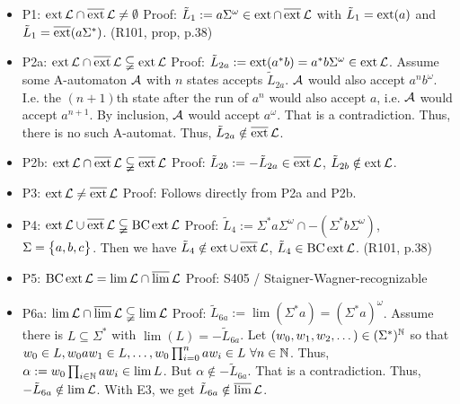 \begin{itemize}
\item P1: $\operatorname{ext} \mathcal{L} \cap \operatorname{\overline{ext}} \mathcal{L} \neq \emptyset$ \newline
Proof: $\tilde{L}_1 := a \Sigma^\omega \in \operatorname{ext} \cap \operatorname{\overline{ext}} \mathcal{L}$ with $\tilde{L}_1 = \operatorname{ext}(a)$ and $\tilde{L}_1 = \operatorname{\overline{ext}} (a \Sigma^*)$. (R101, prop, p.38)
\item P2a: $\operatorname{ext} \mathcal{L} \cap \operatorname{\overline{ext}} \mathcal{L} \subsetneqq \operatorname{ext} \mathcal{L}$ \newline
Proof: $\tilde{L}_{2a} := \operatorname{ext}(a^* b) = a^* b \Sigma^\omega \in \operatorname{ext} \mathcal{L}$. Assume some A-automaton $\mathcal{A}$ with $n$ states accepts $\tilde{L}_{2a}$. $\mathcal{A}$ would also accept $a^n b^\omega$. I.e. the $(n+1)$th state after the run of $a^n$ would also accept $a$, i.e. $\mathcal{A}$ would accept $a^{n+1}$. By inclusion, $\mathcal{A}$ would accept $a^\omega$. That is a contradiction. Thus, there is no such A-automat. Thus, $\tilde{L}_{2a} \notin \operatorname{\overline{ext}} \mathcal{L}$.
\item P2b: $\operatorname{ext} \mathcal{L} \cap \operatorname{\overline{ext}} \mathcal{L} \subsetneqq \operatorname{\overline{ext}} \mathcal{L}$ \newline
Proof: $\tilde{L}_{2b} := - \tilde{L}_{2a} \in \operatorname{\overline{ext}} \mathcal{L}$, $\tilde{L}_{2b} \notin \operatorname{ext} \mathcal{L}$.
\item P3: $\operatorname{ext} \mathcal{L} \neq \operatorname{\overline{ext}} \mathcal{L}$ \newline
Proof: Follows directly from P2a and P2b.
\item P4: $\operatorname{ext} \mathcal{L} \cup \operatorname{\overline{ext}} \mathcal{L} \subsetneqq \operatorname{BC} \operatorname{ext} \mathcal{L}$ \newline
Proof: $\tilde{L}_4 := \Sigma^* a \Sigma^\omega \cap -(\Sigma^* b \Sigma^\omega)$, $\Sigma = \Set{a,b,c}$. Then we have $\tilde{L}_4 \notin \operatorname{ext} \cup \operatorname{\overline{ext}} \mathcal{L}$, $\tilde{L}_4 \in \operatorname{BC} \operatorname{ext} \mathcal{L}$. (R101, p.38)
\item P5: $\operatorname{BC} \operatorname{ext} \mathcal{L} = \lim \mathcal{L} \cap \operatorname{\overline{lim}} \mathcal{L}$ \newline
Proof: S405 / Staigner-Wagner-recognizable
\item P6a: $\lim \mathcal{L} \cap \operatorname{\overline{lim}} \mathcal{L} \subsetneqq \lim \mathcal{L}$ \newline
Proof: $\tilde{L}_{6a} := \lim(\Sigma^* a) = (\Sigma^* a)^\omega$. Assume there is $L \subseteq \Sigma^*$ with $\lim(L) = -\tilde{L}_{6a}$. Let $(w_0,w_1,w_2,\dotsc) \in (\Sigma^*)^{\mathbb{N}}$ so that $w_0 \in L, w_0 a w_1 \in L, \dotsc, w_0 \prod_{i=0}^n a w_i \in L \ \forall n \in \mathbb{N}$. Thus, $\alpha := w_0 \prod_{i \in \mathbb{N}} a w_i \in \lim L$. But $\alpha \notin -\tilde{L}_{6a}$. That is a contradiction. Thus, $-\tilde{L}_{6a} \notin \lim \mathcal{L}$. With E3, we get $\tilde{L}_{6a} \notin \operatorname{\overline{lim}} \mathcal{L}$.

\end{itemize}
